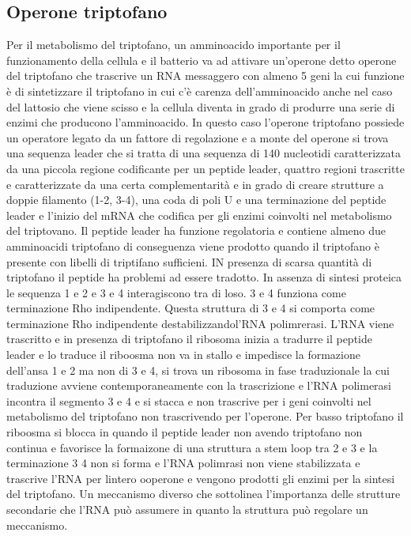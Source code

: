 \subsection{Operone triptofano}
Per il metabolismo del triptofano, un amminoacido importante per il funzionamento della cellula e il batterio va ad attivare un'operone detto operone del triptofano che trascrive un
RNA messaggero con almeno 5 geni la cui funzione \`e di sintetizzare il triptofano in cui c'\`e carenza dell'amminoacido anche nel caso del lattosio che viene scisso e la cellula diventa
in grado di produrre una serie di enzimi che producono l'amminoacido. In questo caso l'operone triptofano possiede un operatore legato da un fattore di regolazione e a monte del operone
si trova una sequenza leader che si tratta di una sequenza di 140 nucleotidi caratterizzata da una piccola regione codificante per un peptide leader, quattro regioni trascritte e 
caratterizzate da una certa complementarit\`a e in grado di creare strutture a doppie filamento (1-2, 3-4), una coda di poli U e una terminazione del peptide leader e l'inizio del mRNA
che codifica per gli enzimi coinvolti nel metabolismo del triptovano. Il peptide leader ha funzione regolatoria e contiene almeno due amminoacidi triptofano di conseguenza viene prodotto
quando il triptofano \`e presente con libelli di triptifano sufficieni. IN presenza di scarsa quantit\`a di triptofano il peptide ha problemi ad essere tradotto. In assenza di sintesi 
proteica le sequenza 1 e 2 e 3 e 4 interagiscono tra di loso. 3 e 4 funziona come terminazione Rho indipendente. Questa struttura di 3 e 4 si comporta come terminazione Rho indipendente 
destabilizzandol'RNA polimrerasi. L'RNA viene trascritto e in presenza di triptofano il ribosoma inizia a tradurre il peptide leader e lo traduce il riboosma non va in stallo e impedisce
la formazione dell'ansa 1 e 2 ma non di 3 e 4, si trova un ribosoma in fase traduzionale la cui traduzione avviene contemporaneamente con la trascrizione e l'RNA polimerasi incontra il 
segmento 3 e 4 e si stacca e non trascrive per i geni coinvolti nel metabolismo del triptofano non trascrivendo per l'operone. Per basso triptofano il riboosma si blocca in quando il
peptide leader non avendo triptofano non continua e favorisce la formaizone di una struttura a stem loop tra 2 e 3 e la terminazione 3 4 non si forma e l'RNA polimrasi non viene 
stabilizzata e trascrive l'RNA per lintero ooperone e vengono prodotti gli enzimi per la sintesi del triptofano. Un meccanismo diverso che sottolinea l'importanza delle strutture 
secondarie che l'RNA pu\`o assumere in quanto la struttura pu\`o regolare un meccanismo. 
